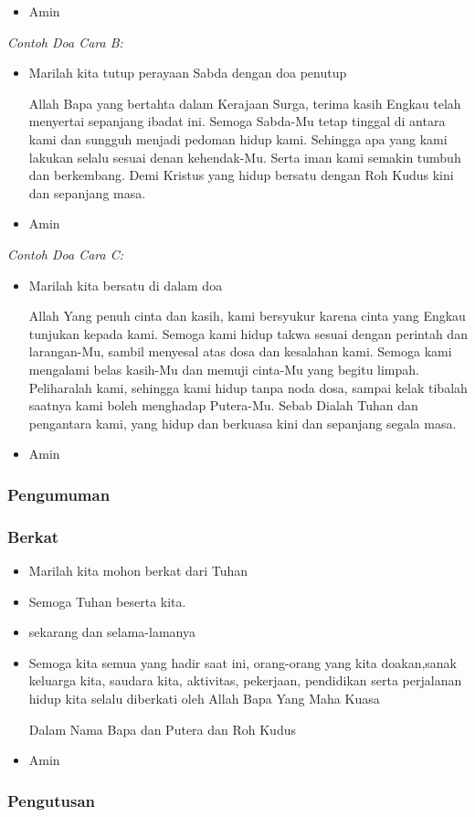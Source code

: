 \documentclass[a4paper,12pt]{article}
\newcommand{\BU}[1]{\begin{itemize} \item[U:] #1 \end{itemize}}
\newcommand{\BP}[1]{\begin{itemize} \item[P:] #1 \end{itemize}}
\begin{document}
\BU{Amin}

\textit{Contoh Doa Cara B:}

\BP{Marilah kita tutup perayaan Sabda dengan doa penutup

 Allah Bapa yang bertahta dalam Kerajaan Surga, terima kasih Engkau telah menyertai sepanjang ibadat ini. 
Semoga Sabda-Mu tetap tinggal di antara kami dan sungguh menjadi pedoman hidup kami. Sehingga apa yang kami
lakukan selalu sesuai denan kehendak-Mu. Serta iman kami semakin tumbuh dan berkembang. Demi Kristus yang hidup
bersatu dengan Roh Kudus kini dan sepanjang masa.}

\BU{Amin}

\textit{Contoh Doa Cara C:}

\BP{Marilah kita bersatu di dalam doa

 Allah Yang penuh cinta dan kasih, kami bersyukur karena cinta yang Engkau tunjukan kepada kami. 
Semoga kami hidup takwa sesuai dengan perintah dan larangan-Mu, sambil menyesal atas dosa dan kesalahan
kami. Semoga kami mengalami belas kasih-Mu dan memuji cinta-Mu yang begitu limpah. Peliharalah kami,
sehingga kami hidup tanpa noda dosa, sampai kelak tibalah saatnya kami boleh menghadap Putera-Mu. Sebab Dialah Tuhan
dan pengantara kami, yang hidup dan berkuasa kini dan sepanjang segala masa.}

\BU{Amin}

\subsubsection*{Pengumuman}

\subsubsection*{Berkat}

\BP{Marilah kita mohon berkat dari Tuhan}

\BP{Semoga Tuhan beserta kita.}

\BU{sekarang dan selama-lamanya}

\BP{Semoga kita semua yang hadir saat ini, orang-orang yang kita doakan,sanak keluarga kita, saudara
kita, aktivitas, pekerjaan, pendidikan serta perjalanan hidup kita selalu diberkati oleh Allah Bapa Yang Maha
Kuasa

Dalam Nama Bapa dan Putera dan Roh Kudus}

\BU{Amin}

\subsubsection*{Pengutusan}
\end{document}
